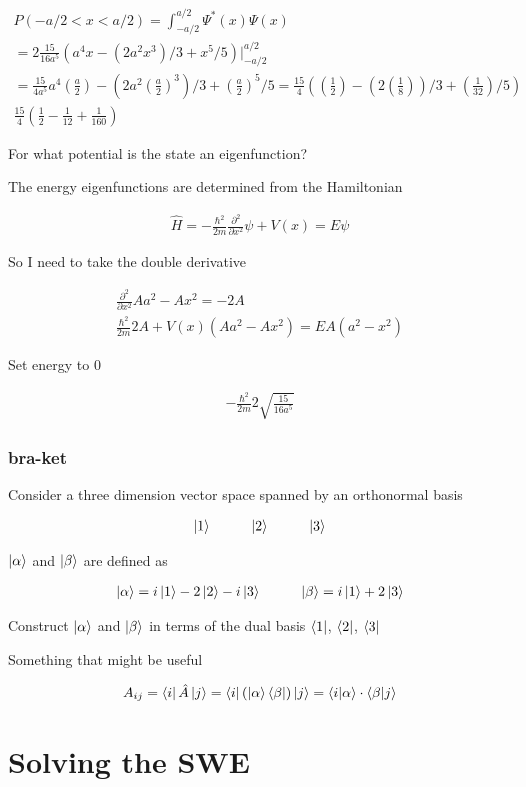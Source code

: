 \documentclass[fleqn]{report}
\newcommand{\hp}{\hspace{1cm}}
\newcommand{\del}{\partial}
\newcommand{\equations} [1] {
\begin{gather*}
#1
\end{gather*}
}
\begin{document}
\equations{
    P(-a/2 < x < a/2)
    =
    \int^{a/2}_{-a/2}
    \Psi^*(x) \Psi(x)
    \\
    =
    2 \frac{15}{16 a^5}
    \left(
        a^4 x - (2 a^2 x^3)/3 + x^5/5
    \right)
    \Big|^{a/2}_{-a/2}
    \\
    =
    \frac{15}{4 a^5}
    a^4 (\frac{a}{2}) - (2 a^2 (\frac{a}{2})^3)/3 + (\frac{a}{2})^5/5
    =
    \frac{15}{4 }
    \left(
    (\frac{1}{2}) - (2  (\frac{1}{8}))/3 + (\frac{1}{32})/5
    \right)
    \\
    \frac{15}{4 }
    \left(
        \frac{1}{2}
        -
        \frac{1}{12}
        +
        \frac{1}{160}
    \right)
}

For what potential is the state an eigenfunction?

The energy eigenfunctions are determined from the Hamiltonian
\equations{
    \hat H 
    =
    - \frac{\hbar^2}{2m}
    \frac{\del^2}{\del x^2}
    \psi
    +
    V(x)
    =
    E \psi
}

So I need to take the double derivative 

\equations{
    \frac{\del^2}{\del x^2}
    Aa^2 - Ax^2
    =
    -2A
    \\
    \frac{\hbar^2}{2m}
    2A
    +
    V(x) ( Aa^2 - Ax^2)
    =
    E A (a^2 - x^2)
}

Set energy to 0 

\equations{
    -\frac{\hbar^2}{2m}
    2 \sqrt{\frac{15}{16 a^5}}
}

\subsection{bra-ket}
Consider a three dimension vector space spanned by an orthonormal basis 
\equations{
    \ket{1}
    \hp
    \ket{2}
    \hp
    \ket{3}
}

$\ket{\alpha}$ and $\ket{\beta}$ are defined as 

\equations{
    \ket{\alpha}
    =
    i \ket{1} - 2\ket{2} - i \ket{3}
    \hp
    \ket{\beta}
    =
    i \ket{1} + 2 \ket{3}
}

Construct $\ket{\alpha}$ and $\ket{\beta}$ in terms of the dual basis 
$\bra{1}$, $\bra{2}$, $\bra{3}$

Something that might be useful 
\equations{
    A_{ij} 
    =
    \bra{i} \hat A \ket{j}
    =
    \bra{i} (\ket{\alpha} \bra{\beta}) \ket{j}
    =
    \bra{i}\ket{\alpha}
    \cdot
    \bra{\beta}\ket{j}
}

\chapter{Solving the SWE}
\end{document}
